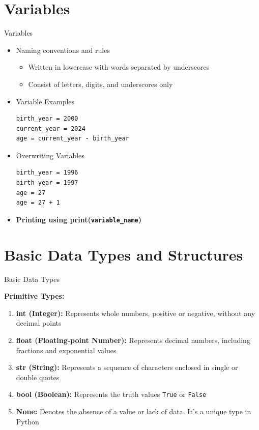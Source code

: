 \documentclass[
	11pt, 
]{beamer}
\begin{document}
\section{Variables}
\begin{frame}[fragile]{Variables}
    \begin{itemize}
        \item Naming conventions and rules \smallskip
                \begin{itemize}
                    \item Written in lowercase with words separated by underscores \smallskip
                    \item Consist of letters, digits, and underscores only
                \end{itemize} \bigskip
            
        \item Variable Examples \smallskip
            \begin{verbatim}
birth_year = 2000
current_year = 2024
age = current_year - birth_year
            \end{verbatim}\smallskip
    

   \item Overwriting Variables \smallskip
    \begin{verbatim}
birth_year = 1996
birth_year = 1997
age = 27
age = 27 + 1
    \end{verbatim}
    \item \textbf{Printing using print(\texttt{variable\_name})}
    \end{itemize}
\end{frame}


\section{Basic Data Types and Structures}
\begin{frame}{Basic Data Types}

\textbf{Primitive Types:} \bigskip
    \begin{enumerate}
        \item \textbf{int (Integer):} Represents whole numbers, positive or negative, without any decimal points \smallskip
        \item \textbf{float (Floating-point Number):} Represents decimal numbers, including fractions and exponential values \smallskip
        \item \textbf{str (String):} Represents a sequence of characters enclosed in single or double quotes \smallskip
        \item \textbf{bool (Boolean):} Represents the truth values \texttt{True} or \texttt{False} \smallskip
        \item \textbf{None:} Denotes the absence of a value or lack of data. It's a unique type in Python \smallskip
    \end{enumerate}
\end{frame}
\end{document}
